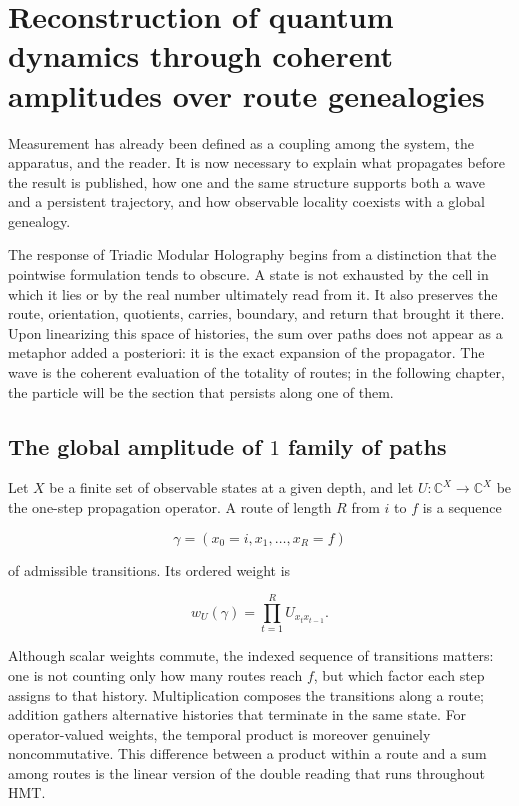 \chapter{Reconstruction of quantum dynamics through coherent amplitudes over route genealogies}


Measurement has already been defined as a coupling among the system, the apparatus, and the reader. It is now necessary to explain what propagates before the result is published, how one and the same structure supports both a wave and a persistent trajectory, and how observable locality coexists with a global genealogy.

The response of Triadic Modular Holography begins from a distinction that the pointwise formulation tends to obscure. A state is not exhausted by the cell in which it lies or by the real number ultimately read from it. It also preserves the route, orientation, quotients, carries, boundary, and return that brought it there. Upon linearizing this space of histories, the sum over paths does not appear as a metaphor added a posteriori: it is the exact expansion of the propagator. The wave is the coherent evaluation of the totality of routes; in the following chapter, the particle will be the section that persists along one of them.

\section{The global amplitude of \(1\) family of paths}

Let \(X\) be a finite set of observable states at a given depth, and let
\(U:\mathbb C^X\to\mathbb C^X\) be the one-step propagation operator. A route of
length \(R\) from \(i\) to \(f\) is a sequence

\[
  \gamma=(x_0=i,x_1,\ldots,x_R=f)
\]

of admissible transitions. Its ordered weight is

\[
  w_U(\gamma)=\prod_{t=1}^{R}U_{x_t x_{t-1}}.
\]

Although scalar weights commute, the indexed sequence of transitions matters:
one is not counting only how many routes reach \(f\), but which factor each
step assigns to that history. Multiplication composes the transitions along a route;
addition gathers alternative histories that terminate in the same state. For
operator-valued weights, the temporal product is moreover genuinely noncommutative. This
difference between a product within a route and a sum among routes is the linear
version of the double reading that runs throughout HMT.

